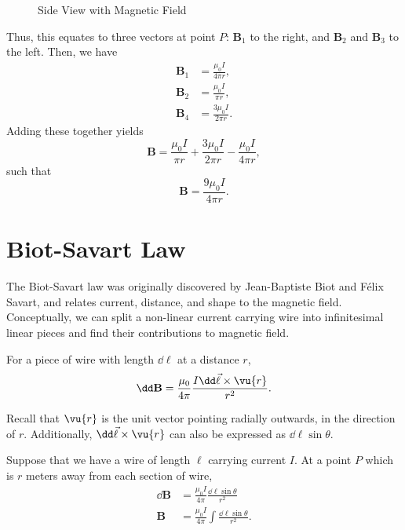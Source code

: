 \documentclass[11pt]{article}
\begin{document}
\begin{figure}[h!t]
    \caption{Side View with Magnetic Field}
\end{figure}
Thus, this equates to three vectors at point $P$: $\mathbf{B}_1$ to the right, and $\mathbf{B}_2$ and $\mathbf{B}_3$ to the left. Then, we have
\begin{align*}
    \mathbf{B}_1 &= \frac{\mu_0 I}{4\pi r}, \\
    \mathbf{B}_2 &= \frac{\mu_0 I}{\pi r}, \\
    \mathbf{B}_4 &= \frac{3\mu_0 I}{2\pi r}.
\end{align*}
Adding these together yields
\[\mathbf{B} = \frac{\mu_0 I}{\pi r} + \frac{3\mu_0 I}{2\pi r} - \frac{\mu_0 I}{4\pi r},\]
such that \[\mathbf{B} = \boxed{\frac{9\mu_0 I}{4\pi r}}.\]

\section{Biot-Savart Law}
The Biot-Savart law was originally discovered by Jean-Baptiste Biot and F\'elix Savart, and relates current, distance, and shape to the magnetic field. Conceptually, we can split a non-linear current carrying wire into infinitesimal linear pieces and find their contributions to magnetic field.
\begin{thrm}
    For a piece of wire with length $\dd \ell$ at a distance $r$,
    \begin{equation}
        \dd \mathbf{B} = \frac{\mu_0}{4\pi} \frac{I\dd \vec{\ell} \times \vu{r}}{r^2}.
    \end{equation}
\end{thrm}
Recall that $\vu{r}$ is the unit vector pointing radially outwards, in the direction of $r$. Additionally, $\dd \vec{\ell} \times \vu{r}$ can also be expressed as $\dd \ell \sin\theta$.

Suppose that we have a wire of length $\ell$ carrying current $I$. At a point $P$ which is $r$ meters away from each section of wire,
\begin{align*}
    \dd \mathbf{B} &= \frac{\mu_0 I}{4\pi} \frac{\dd \ell \sin\theta}{r^2} \\
    \mathbf{B} &= \frac{\mu_0 I}{4\pi} \int \frac{\dd \ell \sin\theta}{r^2}.
\end{align*}
\end{document}
